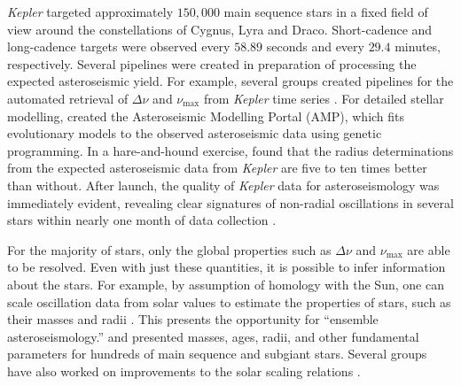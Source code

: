 \emph{Kepler} targeted approximately $150,000$ main sequence stars in a fixed field of view around the constellations of Cygnus, Lyra and Draco. 
Short-cadence and long-cadence targets were observed every $58.89$ seconds and every $29.4$ minutes, respectively. 
Several pipelines were created in preparation of processing the expected asteroseismic yield. 
For example, several groups created pipelines for the automated retrieval of ${\Delta\nu}$ and $\nu_{\max}$ from \emph{Kepler} time series \citep[e.g.,][]{2009CoAst.160...74H, 2009A&A...508..877M, 2010MNRAS.402.2049H, 2010A&A...511A..46M}. 
For detailed stellar modelling, \citet{2009ApJ...699..373M} created the Asteroseismic Modelling Portal (AMP), which fits evolutionary models to the observed asteroseismic data using genetic programming. 
In a hare-and-hound exercise, \citet{2009ApJ...700.1589S} found that the radius determinations from the expected asteroseismic data from \emph{Kepler} are five to ten times better than without. 
After launch, the quality of \emph{Kepler} data for asteroseismology was immediately evident, revealing clear signatures of non-radial oscillations in several stars within nearly one month of data collection \citep{2010PASP..122..131G, 2010ApJ...713L.169C}. 


For the majority of stars, only the global properties such as ${\Delta\nu}$ and $\nu_{\max}$ are able to be resolved. 
Even with just these quantities, it is possible to infer information about the stars. 
For example, by assumption of homology with the Sun, one can scale oscillation data from solar values to estimate the properties of stars, such as their masses and radii \citep[e.g.,][]{1995A&A...293...87K}. %
This presents the opportunity for ``ensemble asteroseismology.''
\citet{2011Sci...332..213C,2014ApJS..210....1C} and \citet{2017ApJS..233...23S} presented masses, ages, radii, and other fundamental parameters for hundreds of main sequence and subgiant stars. 
Several groups have also worked on improvements to the solar scaling relations \citep[e.g.,][]{2013A&A...550A.126M,2016ApJ...822...15S,2016MNRAS.460.4277G,2017MNRAS.470.2069G,2017ApJ...843...11V}. 

